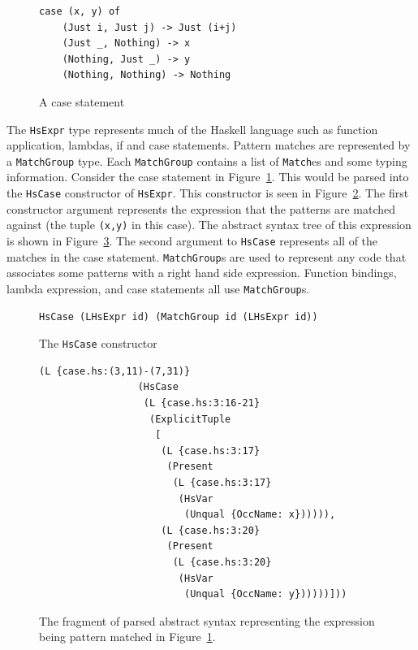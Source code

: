 \begin{figure}[t]
\begin{lstlisting}
case (x, y) of
	(Just i, Just j) -> Just (i+j)	
	(Just _, Nothing) -> x
	(Nothing, Just _) -> y
	(Nothing, Nothing) -> Nothing
\end{lstlisting}
\caption{A case statement}
\label{caseStmt}
\end{figure}

The \texttt{HsExpr} type represents much of the Haskell language such as function application, lambdas, if and case statements. Pattern matches are represented by a \texttt{MatchGroup} type. Each \texttt{MatchGroup} contains a list of \texttt{Match}es and some typing information. Consider the case statement in Figure~\ref{caseStmt}. This would be parsed into the \texttt{HsCase} constructor of \texttt{HsExpr}. This constructor is seen in Figure~\ref{hscase}. The first constructor argument represents the expression that the patterns are matched against (the tuple \texttt{(x,y)} in this case). The abstract syntax tree of this expression is shown in Figure~\ref{caseAST}. The second argument to \texttt{HsCase} represents all of the matches in the case statement. \texttt{MatchGroup}s are used to represent any code that associates some patterns with a right hand side expression. Function bindings, lambda expression, and case statements all use \texttt{MatchGroup}s. 

\begin{figure}[t]
\begin{lstlisting}
HsCase (LHsExpr id) (MatchGroup id (LHsExpr id))	
\end{lstlisting}
\caption{The \texttt{HsCase} constructor}
\label{hscase}
\end{figure}

\begin{figure}[t]
\begin{lstlisting}
(L {case.hs:(3,11)-(7,31)} 
                 (HsCase 
                  (L {case.hs:3:16-21} 
                   (ExplicitTuple 
                    [
                     (L {case.hs:3:17} 
                      (Present 
                       (L {case.hs:3:17} 
                        (HsVar 
                         (Unqual {OccName: x}))))),
                     (L {case.hs:3:20} 
                      (Present 
                       (L {case.hs:3:20} 
                        (HsVar 
                         (Unqual {OccName: y})))))]))
\end{lstlisting}
\caption{The fragment of parsed abstract syntax representing the expression being pattern matched in Figure~\ref{caseStmt}.}
\label{caseAST}
\end{figure}

